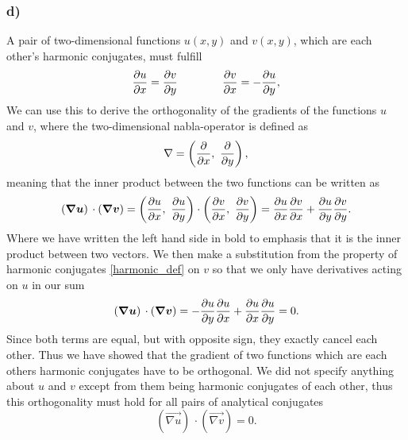 \documentclass[12pt,twoside]{article}
\begin{document}
\subsubsection*{d)}
A pair of two-dimensional functions $u(x, y)$ and $v(x, y)$, which are each other's harmonic conjugates, must fulfill
\begin{equation}
  \pdv{u}{x} = \pdv{v}{y} \qquad \qquad \pdv{v}{x} = - \pdv{u}{y}, \label{harmonic_def}
\end{equation}
We can use this to derive the orthogonality of the gradients of the functions $u$ and $v$, where the two-dimensional nabla-operator is defined as
\begin{equation}
  \nabla = \left( \pdv{}{x}, \,\, \pdv{}{y} \right),
\end{equation}
meaning that the inner product between the two functions can be written as
\begin{equation}
  \left( {\boldsymbol{{ \nabla u}}} \right) \,\cdot   \left( {\boldsymbol{{ \nabla v}}} \right) = \left( \pdv{u}{x}, \,\, \pdv{u}{y} \right)\cdot \left( \pdv{v}{x}, \,\, \pdv{v}{y} \right) = \pdv{u}{x}\pdv{v}{x} + \pdv{u}{y}\pdv{v}{y}.
\end{equation}
Where we have written the left hand side in bold to emphasis that it is the inner product between two vectors. We then make a substitution from the property of harmonic conjugates \eqref{harmonic_def} on $v$ so that we only have derivatives acting on $u$ in our sum
\begin{equation}
  \left( {\boldsymbol{{ \nabla u}}} \right) \,\cdot   \left( {\boldsymbol{{ \nabla v}}} \right) = -\pdv{u}{y}\pdv{u}{x} + \pdv{u}{x}\pdv{u}{y} = 0.
\end{equation}
Since both terms are equal, but with opposite sign, they exactly cancel each other. Thus we have showed that the gradient of two functions which are each others harmonic conjugates have to be orthogonal. We did not specify anything about $u$ and $v$ except from them being harmonic conjugates of each other, thus this orthogonality must hold for all pairs of analytical conjugates
\begin{equation}
  \left( \vec{ \nabla u} \right) \,\cdot   \left( \vec{ \nabla v} \right) = 0. \label{ortogonality_harmo}
\end{equation}
\end{document}

